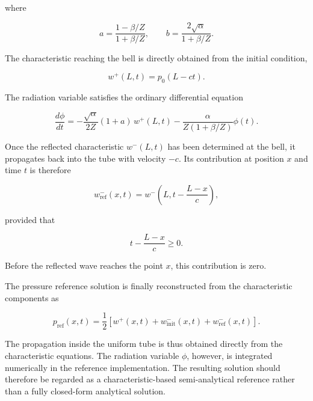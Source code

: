 \documentclass[11pt,a4paper]{report}
\theoremstyle{plain}
\theoremstyle{definition}
\begin{document}
where

\begin{equation}
a
=
\frac{1-\beta/Z}{1+\beta/Z},
\qquad
b
=
\frac{2\sqrt{\alpha}}{1+\beta/Z}.
\end{equation}

The characteristic reaching the bell is directly obtained from the initial
condition,

\begin{equation}
w^+(L,t)
=
p_0(L-ct).
\end{equation}

The radiation variable satisfies the ordinary differential equation

\begin{equation}
\frac{d\phi}{dt}
=
-
\frac{\sqrt{\alpha}}{2Z}(1+a)\,
w^+(L,t)
-
\frac{\alpha}{Z(1+\beta/Z)}
\phi(t).
\label{eq:reference_radiation_ode}
\end{equation}

Once the reflected characteristic \(w^-(L,t)\) has been determined at the
bell, it propagates back into the tube with velocity \(-c\). Its contribution
at position \(x\) and time \(t\) is therefore

\begin{equation}
w^-_{\mathrm{ref}}(x,t)
=
w^-
\left(
L,
t-\frac{L-x}{c}
\right),
\label{eq:reflected_characteristic}
\end{equation}

provided that

\begin{equation}
t-\frac{L-x}{c}\geq0.
\end{equation}

Before the reflected wave reaches the point \(x\), this contribution is zero.

The pressure reference solution is finally reconstructed from the
characteristic components as

\begin{equation}
\boxed{
p_{\mathrm{ref}}(x,t)
=
\frac{1}{2}
\left[
w^+(x,t)
+
w^-_{\mathrm{init}}(x,t)
+
w^-_{\mathrm{ref}}(x,t)
\right].
}
\label{eq:reference_pressure_solution}
\end{equation}

The propagation inside the uniform tube is thus obtained directly from the
characteristic equations. The radiation variable \(\phi\), however, is
integrated numerically in the reference implementation. The resulting
solution should therefore be regarded as a characteristic-based
semi-analytical reference rather than a fully closed-form analytical solution.
\end{document}
